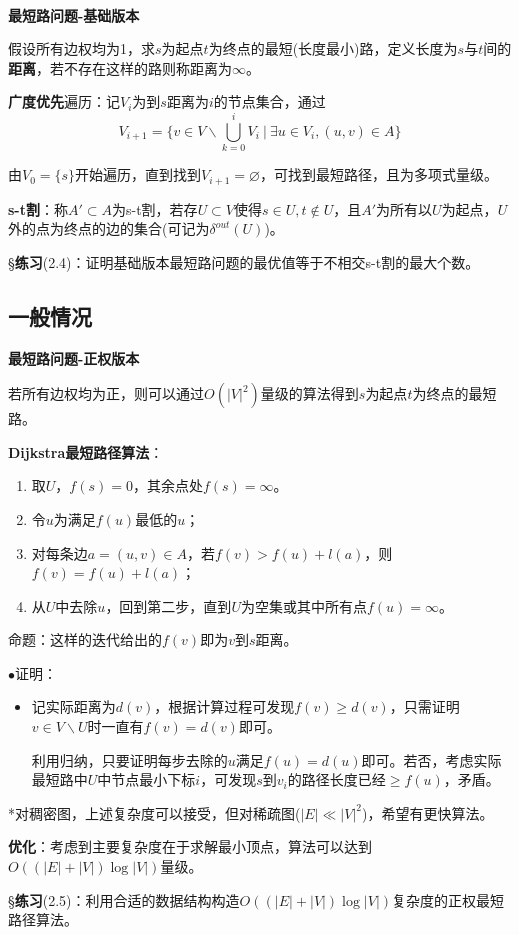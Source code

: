 \documentclass[a4paper,UTF8,fontset=windows]{ctexart}
\newcommand{\exce}[2]{\S\textbf{练习}(#1)：{\kaishu #2}}
\newcommand{\proo}[1]{{\kaishu $\bullet$证明：
\begin{itemize}
    \item[] #1
\end{itemize}
}}
\begin{document}
\

\textbf{最短路问题-基础版本}

假设所有边权均为1，求$s$为起点$t$为终点的最短(长度最小)路，定义长度为$s$与$t$间的\textbf{距离}，若不存在这样的路则称距离为$\infty$。

\textbf{广度优先}遍历：记$V_i$为到$s$距离为$i$的节点集合，通过
$$V_{i+1}=\bigg\{v\in V\backslash\bigcup_{k=0}^iV_i\ \bigg|\ \exists u\in V_i,(u,v)\in A\bigg\}$$

由$V_0=\{s\}$开始遍历，直到找到$V_{i+1}=\varnothing$，可找到最短路径，且为多项式量级。

\textbf{s-t割}：称$A'\subset A$为s-t割，若存$U\subset V$使得$s\in U,t\notin U$，且$A'$为所有以$U$为起点，$U$外的点为终点的边的集合(可记为$\delta^{out}(U)$)。

\exce{2.4}{证明基础版本最短路问题的最优值等于不相交s-t割的最大个数。}

\subsection{一般情况}
\textbf{最短路问题-正权版本}

若所有边权均为正，则可以通过$O(|V|^2)$量级的算法得到$s$为起点$t$为终点的最短路。

\textbf{Dijkstra最短路径算法}：
\begin{enumerate}
    \item 取$U$，$f(s)=0$，其余点处$f(s)=\infty$。
    \item 令$u$为满足$f(u)$最低的$u$；
    \item 对每条边$a=(u,v)\in A$，若$f(v)>f(u)+l(a)$，则$f(v)=f(u)+l(a)$；
    \item 从$U$中去除$u$，回到第二步，直到$U$为空集或其中所有点$f(u)=\infty$。
\end{enumerate}

命题：这样的迭代给出的$f(v)$即为$v$到$s$距离。

\proo{
    记实际距离为$d(v)$，根据计算过程可发现$f(v)\ge d(v)$，只需证明$v\in V\backslash U$时一直有$f(v)=d(v)$即可。

    利用归纳，只要证明每步去除的$u$满足$f(u)=d(u)$即可。若否，考虑实际最短路中$U$中节点最小下标$i$，可发现$s$到$v_i$的路径长度已经$\ge f(u)$，矛盾。
}

*对稠密图，上述复杂度可以接受，但对稀疏图($|E|\ll|V|^2$)，希望有更快算法。 

\textbf{优化}：考虑到主要复杂度在于求解最小顶点，算法可以达到$O((|E|+|V|)\log|V|)$量级。

\exce{2.5}{利用合适的数据结构构造$O((|E|+|V|)\log|V|)$复杂度的正权最短路径算法。}
\end{document}
